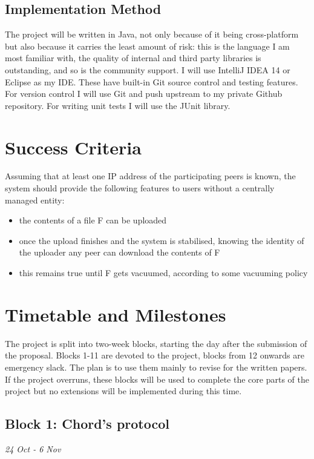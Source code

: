 \documentclass[12pt]{article}
\begin{document}
\subsection{Implementation Method}

The project will be written in Java, not only because of it being cross-platform but also because it carries the least amount of risk: this is the language I am most familiar with, the quality of internal and third party libraries is outstanding, and so is the community support. I will use IntelliJ IDEA 14 or Eclipse as my IDE. These have built-in Git source control and testing features. For version control I will use Git and push upstream to my private Github repository. For writing unit tests I will use the JUnit library.


\section{Success Criteria}

Assuming that at least one IP address of the participating peers is known, the system should provide the following features to users without a centrally managed entity:

\begin{itemize}
\item{the contents of a file F can be uploaded}
\item{once the upload finishes and the system is stabilised, knowing the identity of the uploader any peer can download the contents of F}
\item{this remains true until F gets vacuumed, according to some vacuuming policy}
\end{itemize}

\section{Timetable and Milestones}

The project is split into two-week blocks, starting the day after the submission of the proposal. Blocks 1-11 are devoted to the project, blocks from 12 onwards are emergency slack. The plan is to use them mainly to revise for the written papers. If the project overruns, these blocks will be used to complete the core parts of the project but no extensions will be implemented during this time.


\subsection{Block 1: Chord's protocol}
\emph{24 Oct - 6 Nov}  %
\end{document}
